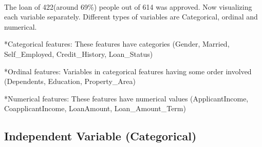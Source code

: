\documentclass[11pt]{article}
\begin{document}
    \begin{center}
    \end{center}
    { \hspace*{\fill} \\}
    
    The loan of 422(around 69\%) people out of 614 was approved. Now
visualizing each variable separately. Different types of variables are
Categorical, ordinal and numerical.

*Categorical features: These features have categories (Gender, Married,
Self\_Employed, Credit\_History, Loan\_Status)

*Ordinal features: Variables in categorical features having some order
involved (Dependents, Education, Property\_Area)

*Numerical features: These features have numerical values
(ApplicantIncome, CoapplicantIncome, LoanAmount, Loan\_Amount\_Term)

    \subsection{Independent Variable
(Categorical)}\label{independent-variable-categorical}
\end{document}
